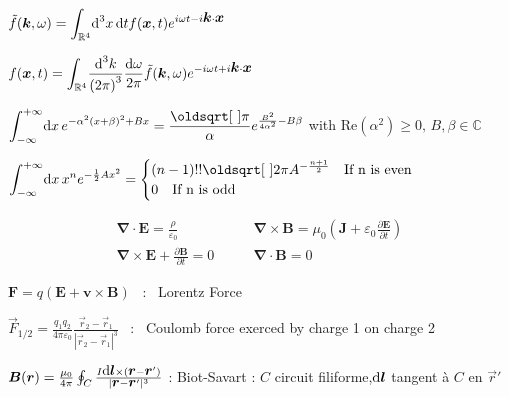 $\tilde{f}(\mbox{\boldmath$k$},\omega) = \displaystyle{\int_{\mathbb{R}^4}} \textrm{d} ^3x\, \textrm{d} t f(\mbox{\boldmath$x$},t) e^{i\omega t - i \mbox{\boldmath$k$}\cdot\mbox{\boldmath$x$}}$  

$f(\mbox{\boldmath$x$}, t) = \displaystyle{\int_{\mathbb{R}^4}} \dfrac{\textrm{d} ^3k}{\left(2\pi\right)^3} \dfrac{\textrm{d} \omega}{2\pi} \tilde{f}(\mbox{\boldmath$k$},\omega)e^{-i\omega t + i \mbox{\boldmath$k$}\cdot\mbox{\boldmath$x$}}$


\squishlist
\item $\displaystyle{\int_{-\infty}^{+\infty}} \ud x \, e^{-\alpha^2(x+\beta)^2 + Bx} = \dfrac{\sqrt{\pi}}{\alpha} \displaystyle{e^{\frac{B^2}{4\alpha^2}-B\beta}} $ with Re$(\alpha^2) \ge 0, \, B, \beta \in \mathbb{C}$ 

\item $      \displaystyle{\int_{-\infty}^{+\infty}} \ud x \, x^n e^{-\frac{1}{2}Ax^2} = 
\begin{cases}
(n-1)!!\sqrt{2\pi}A^{-\frac{n+1}{2}} \quad \text{If n is even} \\
0 \quad \text{If n is odd}
\end{cases}
$
\squishend


$$\boxed{\begin{split}
\boldsymbol{\nabla} \cdot \boldsymbol{E} = \frac{\rho}{\varepsilon_0}
\qquad &\boldsymbol{\nabla} \times \boldsymbol{B} = \mu_0 \left(\boldsymbol{J} + \varepsilon_0\frac{\partial \boldsymbol{E}}{\partial t}\right)\\
\boldsymbol{\nabla} \times \boldsymbol{E} + \frac{\partial \boldsymbol{B}}{\partial t} = 0
\qquad &\boldsymbol{\nabla} \cdot \boldsymbol{B} = 0
\end{split}}$$


\squishlist
\item $ \boldsymbol{F} = q(\boldsymbol{E}+\boldsymbol{v} \times \boldsymbol{B}) $ \, :  \, Lorentz Force

\item $ \vec{F}_{1/2} = \frac{q_1q_2}{4\pi\varepsilon_0} \frac{\vec{r}_2 - \vec{r}_1}{|\vec{r}_2 - \vec{r}_1|^3} $ \, : \, Coulomb force exerced by charge 1 on charge 2
\item $\mbox{\boldmath$B$}(\mbox{\boldmath$r$}) = \frac{\mu_0}{4\pi} \oint_{C} \frac{I \mbox{\boldmath$\textrm{d} l$} \times (\mbox{\boldmath$r$} - \mbox{\boldmath$r$}')}{|\mbox{\boldmath$r$}-\mbox{\boldmath$r$}'|^3} $  :  Biot-Savart : $C$ circuit filiforme,$\mbox{\boldmath$\textrm{d} l$}$ tangent à $C$ en  $\vec{r}'$

